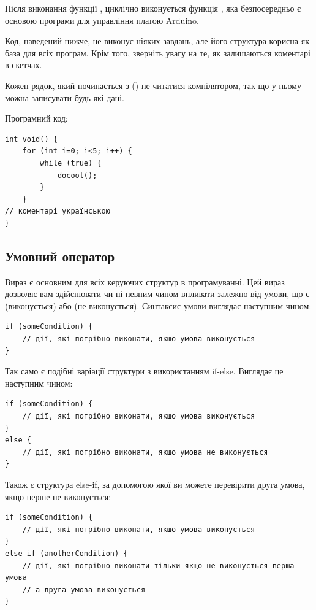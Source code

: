 \documentclass[12pt,a4paper]{report}  %
\begin{document}
Після виконання функції , циклічно виконується функція , яка безпосередньо є основою програми для управління платою Arduino.

Код, наведений нижче, не виконує ніяких завдань, але його структура корисна як база для всіх програм. Крім того, зверніть увагу на те, як залишаються коментарі в скетчах.

Кожен рядок, який починається з (\code{//}) не читатися компілятором, так що у ньому можна записувати будь-які дані.


\newpage

Програмний код:

\begin{lstlisting}[label=some-code,caption=Структура програми]
int void() {
	for (int i=0; i<5; i++) {
		while (true) {
			docool();		
		}	
	}
// коментарі українською
}
\end{lstlisting}	

\subsection{Умовний оператор}

Вираз  є основним для всіх керуючих структур в програмуванні. Цей вираз дозволяє вам здійснювати чи ні певним чином впливати залежно від умови, що є  (виконується) або  (не виконується). Синтаксис умови  виглядає наступним чином:

\begin{lstlisting}[label=conditionoperator,caption=Умовний оператор (неповна форма)]
if (someCondition) {
	// дії, які потрібно виконати, якщо умова виконується
}
\end{lstlisting}

Так само є подібні варіації структури з використанням if-else. Виглядає це наступним чином:

\begin{lstlisting}[label=conditionoperator,caption=Умовний оператор (повна форма)]
if (someCondition) {
	// дії, які потрібно виконати, якщо умова виконується
}
else {
	// дії, які потрібно виконати, якщо умова не виконується
}
\end{lstlisting}

Також є структура else-if, за допомогою якої ви можете перевірити друга умова, якщо перше не виконується:

\begin{lstlisting}[label=conditionoperator,caption=Умовний оператор (декільки умов)]
if (someCondition) {
	// дії, які потрібно виконати, якщо умова виконується
} 
else if (anotherCondition) {
	// дії, які потрібно виконати тільки якщо не виконується перша умова
	// а друга умова виконується
}
\end{lstlisting}
\end{document}
